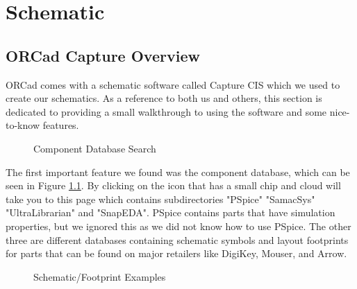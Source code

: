 \chapter{Schematic
\label{Schematic}}
\section{ORCad Capture Overview}
ORCad comes with a schematic software called Capture CIS which we used to create our schematics. As a reference to both us and others, this section is
dedicated to providing a small walkthrough to using the software and some nice-to-know features.
\begin{figure}[H]
  \centering
\caption{Component Database Search}
\label{img:ultralib}
\end{figure}

The first important feature we found was the component database, which can be seen in Figure \ref{img:ultralib}. By clicking on the icon that has a small chip and cloud will 
take you to this page which contains subdirectories "PSpice" "SamacSys" "UltraLibrarian" and "SnapEDA". PSpice contains parts that
have simulation properties, but we ignored this as we did not know how to use PSpice. The other three are different databases
containing schematic symbols and layout footprints for parts that can be found on major retailers like DigiKey, Mouser, and Arrow.

\begin{figure}[H]
  \centering
\caption{Schematic/Footprint Examples}
\label{img:ultralibexample}
\end{figure}

